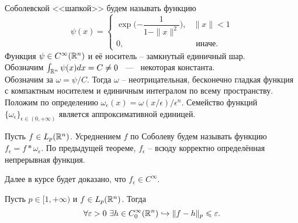 \begin{example}
    Соболевской <<шапкой>> будем называть функцию
    \[
        \psi(x) = \begin{cases}
                      \exp\biggr({-\dfrac{1}{1 - \|x\|^2}}\biggr), & \|x\| < 1 \\
                      0, & \text{ иначе.}
        \end{cases}
    \]
    Функция $\psi \in C^{\infty}(\mathbb{R}^n)$ и её носитель -- замкнутый единичный шар. \\
    Обозначим $\int_{\mathbb{R}^n} \psi(x)dx = C \neq 0$ ~---~ некоторая константа. \\
    Обозначим за $\omega = \psi/C$.
    Тогда $\omega$ -- неотрицательная, бесконечно гладкая функция с компактным носителем и единичным интегралом по всему пространству. \\
    Положим по определению $\omega_\epsilon(x) = \omega(x/\epsilon)/\epsilon^n$.
    Семейство функций $\{\omega_\epsilon\}_{\epsilon \in (0, +\infty)}$ является аппроксимативной единицей.
\end{example}
\begin{corollary}
    Пусть $f \in L_p(\mathbb{R}^n)$.
    Усреднением $f$ по Соболеву будем называть функцию $f_\epsilon = f * \omega_\epsilon$.
    По предыдущей теореме, $f_\epsilon$ -- всюду корректно определённая непрерывная функция.
\end{corollary}
\begin{note}
    Далее в курсе будет доказано, что $f_\epsilon \in C^{\infty}$.
\end{note}
\begin{theorem}
    Пусть $p \in [1, +\infty)$ и $f \in L_p(\mathbb{R}^n)$. Тогда
    \[
        \forall \varepsilon > 0  \ \exists h \in C^{\infty}_0(\mathbb{R}^n) \hookrightarrow \|f - h\|_p \leqslant \varepsilon.
    \]
\end{theorem}
